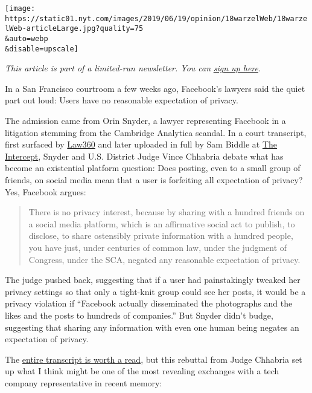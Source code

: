 \texttt{[image: https://static01.nyt.com/images/2019/06/19/opinion/18warzelWeb/18warzelWeb-articleLarge.jpg?quality=75\\\&auto=webp\\\&disable=upscale]}

\emph{This article is part of a limited-run newsletter. You can}
\href{https://www.nytimes.com/newsletters/privacy-project?action=click\&module=inline\&pgtype=Article}{\emph{sign
up here}}\emph{.}

In a San Francisco courtroom a few weeks ago, Facebook's lawyers said
the quiet part out loud: Users have no reasonable expectation of
privacy.

The admission came from Orin Snyder, a lawyer representing Facebook in a
litigation stemming from the Cambridge Analytica scandal. In a court
transcript, first surfaced by
\href{https://www.law360.com/articles/1164091/facebook-says-social-media-users-can-t-expect-privacy}{Law360}
and later uploaded in full by Sam Biddle at
\href{https://theintercept.com/2019/06/14/facebook-privacy-policy-court/}{The
Intercept}, Snyder and U.S. District Judge Vince Chhabria debate what
has become an existential platform question: Does posting, even to a
small group of friends, on social media mean that a user is forfeiting
all expectation of privacy? Yes, Facebook argues:

\begin{quote}
There is no privacy interest, because by sharing with a hundred friends
on a social media platform, which is an affirmative social act to
publish, to disclose, to share ostensibly private information with a
hundred people, you have just, under centuries of common law, under the
judgment of Congress, under the SCA, negated any reasonable expectation
of privacy.
\end{quote}

The judge pushed back, suggesting that if a user had painstakingly
tweaked her privacy settings so that only a tight-knit group could see
her posts, it would be a privacy violation if ``Facebook actually
disseminated the photographs and the likes and the posts to hundreds of
companies.'' But Snyder didn't budge, suggesting that sharing any
information with even one human being negates an expectation of privacy.

The
\href{http://www.documentcloud.org/documents/6153329-05-29-2019-Facebook-Inc-Consumer-Privacy.html}{entire
transcript is worth a read}, but this rebuttal from Judge Chhabria set
up what I think might be one of the most revealing exchanges with a tech
company representative in recent memory:

